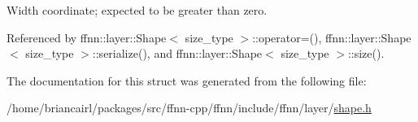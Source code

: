 Width coordinate; expected to be greater than zero. 



Referenced by ffnn\-::layer\-::\-Shape$<$ size\-\_\-type $>$\-::operator=(), ffnn\-::layer\-::\-Shape$<$ size\-\_\-type $>$\-::serialize(), and ffnn\-::layer\-::\-Shape$<$ size\-\_\-type $>$\-::size().



The documentation for this struct was generated from the following file\-:\begin{DoxyCompactItemize}
\item 
/home/briancairl/packages/src/ffnn-\/cpp/ffnn/include/ffnn/layer/\hyperlink{shape_8h}{shape.\-h}\end{DoxyCompactItemize}
